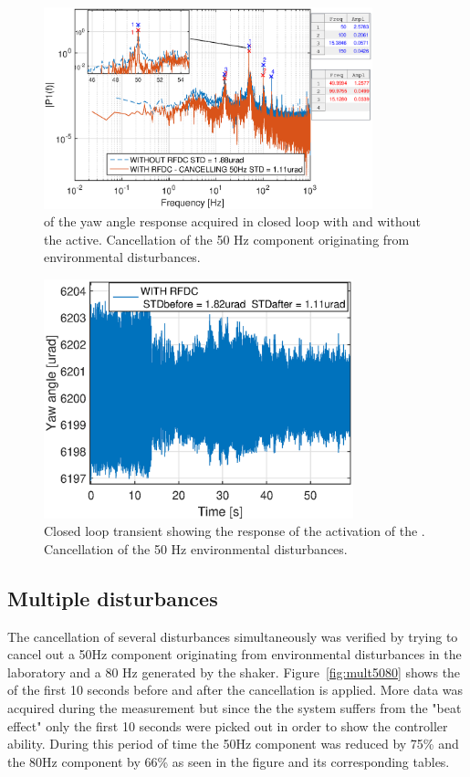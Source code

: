 \begin{figure}[h]
  \centering %
  \includegraphics[width=0.85\textwidth]{fig/matlab/fft_closedloop_50Hz}
  \caption{\label{fig:fft_closedloop_50}\abbrFFT of the yaw angle response acquired in closed loop with and without the \abbrRFDC active. Cancellation of the 50 Hz component originating from environmental disturbances.}
\end{figure}

\begin{figure}[h]
  \centering %
  \includegraphics[width=0.8\textwidth]{fig/matlab/transient_closedloop_50Hz}
  \caption{\label{fig:transient_closedloop_50}Closed loop transient showing the response of the activation of the \abbrRFDC. Cancellation of the 50 Hz environmental disturbances.}
\end{figure}

\FloatBarrier
\subsection{Multiple disturbances}
The cancellation of several disturbances simultaneously was verified by trying to cancel out a 50Hz component originating from environmental disturbances in the laboratory and a 80 Hz generated by the shaker. Figure~\ref{fig:mult5080} shows the \abbrFFT of the first 10 seconds before and after the cancellation is applied. More data was acquired during the measurement but since the the system suffers from the "beat effect" only the first 10 seconds were picked out in order to show the controller ability. During this period of time the 50Hz component was reduced by 75\% and the 80Hz component by 66\% as seen in the figure and its corresponding tables.

